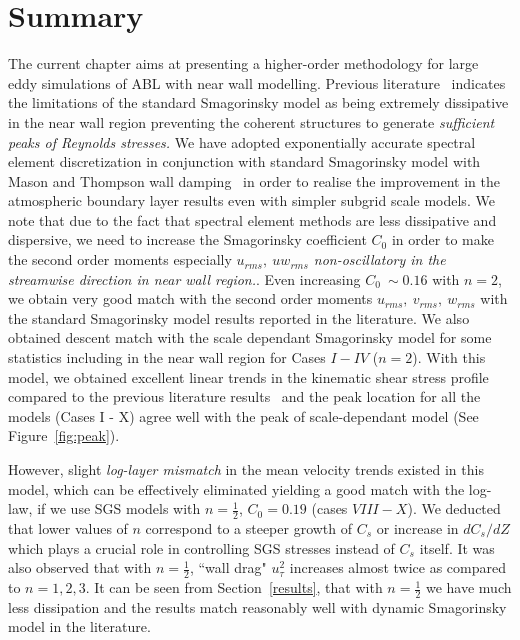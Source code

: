 \section{Summary}
The current chapter aims at presenting a higher-order methodology for large eddy simulations of ABL with near wall modelling. Previous literature~\cite{porte1fun,bou1} indicates the limitations of the standard Smagorinsky model as being extremely dissipative in the near wall region preventing the coherent structures to generate \textit{sufficient peaks of Reynolds stresses.}  We have adopted exponentially accurate spectral element discretization in conjunction with standard Smagorinsky model with Mason and Thompson wall damping~\cite{mason} in order to realise the improvement in the atmospheric boundary layer results even with simpler subgrid scale models. We note that due to the fact that spectral element methods are less dissipative {and} dispersive, we need to increase the Smagorinsky coefficient $C_0$ in order to make the second order moments especially \textit{$u_{rms}, \ uw_{rms}$ non-oscillatory in the streamwise direction in near wall region.}. Even increasing $C_0 \ \sim 0.16$ with $n = 2$, we obtain very good match with the second order moments $u_{rms},\ v_{rms}, \ w_{rms}$ with the standard Smagorinsky model results reported in the literature. We also obtained descent match with the scale dependant Smagorinsky model for some statistics {including} in the near wall region for Cases $I-IV$ ($n = 2$). With this model, we obtained excellent linear trends in the kinematic shear stress profile compared to the previous literature results~\cite{calaf,meyers2} and the peak location for all the models (Cases I - X) agree well with the peak of scale-dependant model (See Figure~\ref{fig:peak}). 

However, slight \textit{log-layer mismatch} in the mean velocity trends existed in this model, which can be {effectively} eliminated {yielding} a good match with the log-law, if we use SGS models with $n = \frac{1}{2}$, $C_0 = 0.19$ (cases $VIII-X$). We deducted that lower values of $n$ correspond to a steeper growth of $C_s$ or {increase in} $dC_s/dZ$ which play{s} a crucial role in controlling SGS stresses instead of $C_s$ itself. It was also observed that with $n = \frac{1}{2}$, ``wall drag" $u_{\tau}^2$ increases almost twice as compared to $n = 1,2,3$. It can be seen from Section~\ref{results}, that with $n = \frac{1}{2}$ we have much less dissipation and the results match reasonably well with dynamic Smagorinsky model in the literature.

